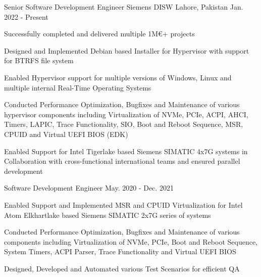 

\begin{cventries}

  \cventry
    {Senior Software Development Engineer} %
    {Siemens DISW} %
    {Lahore, Pakistan} %
    {Jan. 2022 - Present} %
    {
      \begin{cvitems} %
        \item Successfully completed and delivered multiple 1M€+ projects
        \item Designed and Implemented Debian based Installer for Hypervisor with support for BTRFS file system
        \item Enabled Hypervisor support for multiple versions of Windows, Linux and multiple internal Real-Time Operating Systems
        \item Conducted Performance Optimization, Bugfixes and Maintenance of various hypervisor components including Virtualization of NVMe, PCIe, ACPI, AHCI, Timers, LAPIC, Trace Functionality, SIO, Boot and Reboot Sequence, MSR, CPUID and Virtual UEFI BIOS (EDK)
        \item Enabled Support for Intel Tigerlake based Siemens SIMATIC 4x7G systems in Collaboration with cross-functional international teams and ensured parallel development
      \end{cvitems}
    }

  \cventry
    {Software Development Engineer} %
    {} %
    {} %
    {May. 2020 - Dec. 2021} %
    {
      \begin{cvitems} %
        \item Enabled Support and Implemented MSR and CPUID Virtualization for Intel Atom Elkhartlake based Siemens SIMATIC 2x7G series of systems
        \item Conducted Performance Optimization, Bugfixes and Maintenance of various components including Virtualization of NVMe, PCIe, Boot and Reboot Sequence, System Timers, ACPI Parser, Trace Functionality and Virtual UEFI BIOS
        \item Designed, Developed and Automated various Test Scenarios for efficient QA
      \end{cvitems}
    }


\end{cventries}
